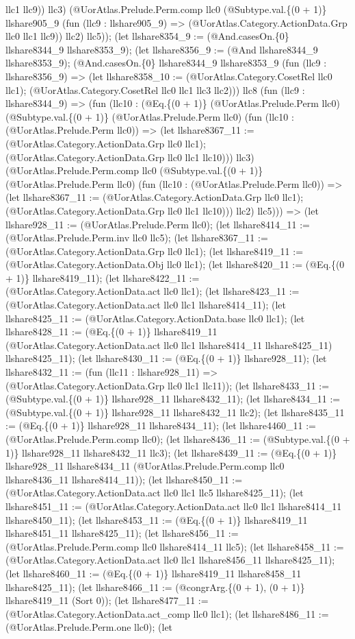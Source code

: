 \documentclass[11pt]{article}
\begin{document}
llc1 llc9)) llc3) (@UorAtlas.Prelude.Perm.comp llc0 (@Subtype.val.\{(0 + 1)\} llshare905\_9 (fun (llc9 : llshare905\_9) => (@UorAtlas.Category.ActionData.Grp llc0 llc1 llc9)) llc2) llc5)); (let llshare8354\_9 := (@And.casesOn.\{0\} llshare8344\_9 llshare8353\_9); (let llshare8356\_9 := (@And llshare8344\_9 llshare8353\_9); (@And.casesOn.\{0\} llshare8344\_9 llshare8353\_9 (fun (llc9 : llshare8356\_9) => (let llshare8358\_10 := (@UorAtlas.Category.CosetRel llc0 llc1); (@UorAtlas.Category.CosetRel llc0 llc1 llc3 llc2))) llc8 (fun (llc9 : llshare8344\_9) => (fun (llc10 : (@Eq.\{(0 + 1)\} (@UorAtlas.Prelude.Perm llc0) (@Subtype.val.\{(0 + 1)\} (@UorAtlas.Prelude.Perm llc0) (fun (llc10 : (@UorAtlas.Prelude.Perm llc0)) => (let llshare8367\_11 := (@UorAtlas.Category.ActionData.Grp llc0 llc1); (@UorAtlas.Category.ActionData.Grp llc0 llc1 llc10))) llc3) (@UorAtlas.Prelude.Perm.comp llc0 (@Subtype.val.\{(0 + 1)\} (@UorAtlas.Prelude.Perm llc0) (fun (llc10 : (@UorAtlas.Prelude.Perm llc0)) => (let llshare8367\_11 := (@UorAtlas.Category.ActionData.Grp llc0 llc1); (@UorAtlas.Category.ActionData.Grp llc0 llc1 llc10))) llc2) llc5))) => (let llshare928\_11 := (@UorAtlas.Prelude.Perm llc0); (let llshare8414\_11 := (@UorAtlas.Prelude.Perm.inv llc0 llc5); (let llshare8367\_11 := (@UorAtlas.Category.ActionData.Grp llc0 llc1); (let llshare8419\_11 := (@UorAtlas.Category.ActionData.Obj llc0 llc1); (let llshare8420\_11 := (@Eq.\{(0 + 1)\} llshare8419\_11); (let llshare8422\_11 := (@UorAtlas.Category.ActionData.act llc0 llc1); (let llshare8423\_11 := (@UorAtlas.Category.ActionData.act llc0 llc1 llshare8414\_11); (let llshare8425\_11 := (@UorAtlas.Category.ActionData.base llc0 llc1); (let llshare8428\_11 := (@Eq.\{(0 + 1)\} llshare8419\_11 (@UorAtlas.Category.ActionData.act llc0 llc1 llshare8414\_11 llshare8425\_11) llshare8425\_11); (let llshare8430\_11 := (@Eq.\{(0 + 1)\} llshare928\_11); (let llshare8432\_11 := (fun (llc11 : llshare928\_11) => (@UorAtlas.Category.ActionData.Grp llc0 llc1 llc11)); (let llshare8433\_11 := (@Subtype.val.\{(0 + 1)\} llshare928\_11 llshare8432\_11); (let llshare8434\_11 := (@Subtype.val.\{(0 + 1)\} llshare928\_11 llshare8432\_11 llc2); (let llshare8435\_11 := (@Eq.\{(0 + 1)\} llshare928\_11 llshare8434\_11); (let llshare4460\_11 := (@UorAtlas.Prelude.Perm.comp llc0); (let llshare8436\_11 := (@Subtype.val.\{(0 + 1)\} llshare928\_11 llshare8432\_11 llc3); (let llshare8439\_11 := (@Eq.\{(0 + 1)\} llshare928\_11 llshare8434\_11 (@UorAtlas.Prelude.Perm.comp llc0 llshare8436\_11 llshare8414\_11)); (let llshare8450\_11 := (@UorAtlas.Category.ActionData.act llc0 llc1 llc5 llshare8425\_11); (let llshare8451\_11 := (@UorAtlas.Category.ActionData.act llc0 llc1 llshare8414\_11 llshare8450\_11); (let llshare8453\_11 := (@Eq.\{(0 + 1)\} llshare8419\_11 llshare8451\_11 llshare8425\_11); (let llshare8456\_11 := (@UorAtlas.Prelude.Perm.comp llc0 llshare8414\_11 llc5); (let llshare8458\_11 := (@UorAtlas.Category.ActionData.act llc0 llc1 llshare8456\_11 llshare8425\_11); (let llshare8460\_11 := (@Eq.\{(0 + 1)\} llshare8419\_11 llshare8458\_11 llshare8425\_11); (let llshare8466\_11 := (@congrArg.\{(0 + 1), (0 + 1)\} llshare8419\_11 (Sort 0)); (let llshare8477\_11 := (@UorAtlas.Category.ActionData.act\_comp llc0 llc1); (let llshare8486\_11 := (@UorAtlas.Prelude.Perm.one llc0); (let 
\end{document}
